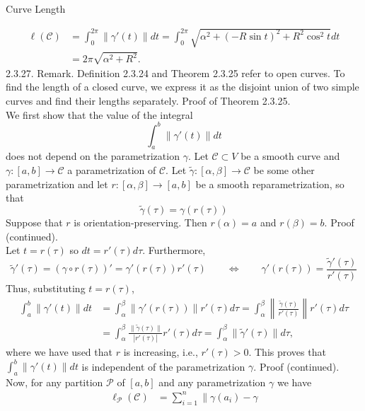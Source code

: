 \documentclass[smaller,hyperref={CJKbookmarks=true}]{beamer}
\begin{document}
\begin{frame}{Curve Length}
\begin{spacing}{1.05}
\begin{equation*}
  \begin{split}
     \ell(\mathcal{C}) &=\int_{0}^{2\pi}\|\gamma'(t)\|dt
     =\int_{0}^{2\pi}\sqrt{\alpha^2+(-R\sin t)^2+R^2\cos^2t}dt \\
       &=2\pi\sqrt{\alpha^2+R^2}.
  \end{split}
\end{equation*}
\alert{2.3.27. Remark.} Definition 2.3.24 and Theorem 2.3.25 refer to open
curves. To find the length of a closed curve, we express it as the disjoint
union of two simple curves and find their lengths separately.
\newpage
\alert{Proof of Theorem 2.3.25.}\\
We first show that the value of the integral
\[\int_{a}^{b}\|\gamma'(t)\|dt\]
does not depend on the parametrization $\gamma$. Let $\mathcal{C}\subset V$ be a smooth curve and $\gamma:[a,b]\to\mathcal{C}$ a parametrization of $\mathcal{C}$. Let $\widetilde{\gamma}:[\alpha,\beta]\to\mathcal{C}$ be some other parametrization and let $r:[\alpha,\beta]\to[a,b]$ be a smooth reparametrization, so that
\[\widetilde{\gamma}(\tau)=\gamma(r(\tau))\]
Suppose that $r$ is orientation-preserving. Then $r(\alpha)=a$ and $r(\beta)=b$.
\newpage
\alert{Proof (continued).}\\
Let $t=r(\tau)$ so $dt=r'(\tau)d\tau$. Furthermore,
\[\widetilde{\gamma}'(\tau)=\left(\gamma\circ
r(\tau)\right)'=\gamma'(r(\tau))r'(\tau)
\qquad\Leftrightarrow\qquad\gamma'(r(\tau))=
\frac{\widetilde{\gamma}'(\tau)}{r'(\tau)}\]
Thus, substituting $t=r(\tau)$,
\begin{equation*}
  \begin{split}
     \int_{a}^{b}\|\gamma'(t)\|dt &=\int_{\alpha}^{\beta}\|\gamma'(r(\tau))\|r'(\tau)d\tau
     =\int_{\alpha}^{\beta}\left\|\frac{\widetilde{\gamma}(\tau)}{r'(\tau)}
     \right\|r'(\tau)d\tau \\
       &=\int_{\alpha}^{\beta}\frac{\|\widetilde{\gamma}(\tau)\|}{|r'(\tau)|}r'(\tau)d\tau
       =\int_{\alpha}^{\beta}\|\widetilde{\gamma}'(\tau)\|d\tau,
  \end{split}
\end{equation*}
where we have used that $r$ is increasing, i.e., $r'(\tau)>0$. This proves that $\int_{a}^{b}\|\gamma'(t)\|dt$ is independent of the parametrization $\gamma$.
\newpage
\alert{Proof (continued).}\\
Now, for any partition $\mathcal{P}$ of $[a,b]$ and any parametrization $\gamma$ we have
\begin{equation*}
  \begin{split}
     \ell_\mathcal{P}(\mathcal{C}) &=\sum_{i=1}^{n}\|\gamma(a_i)-\gamma

\end{split}
\end{equation*}
\end{spacing}
\end{frame}
\end{document}
